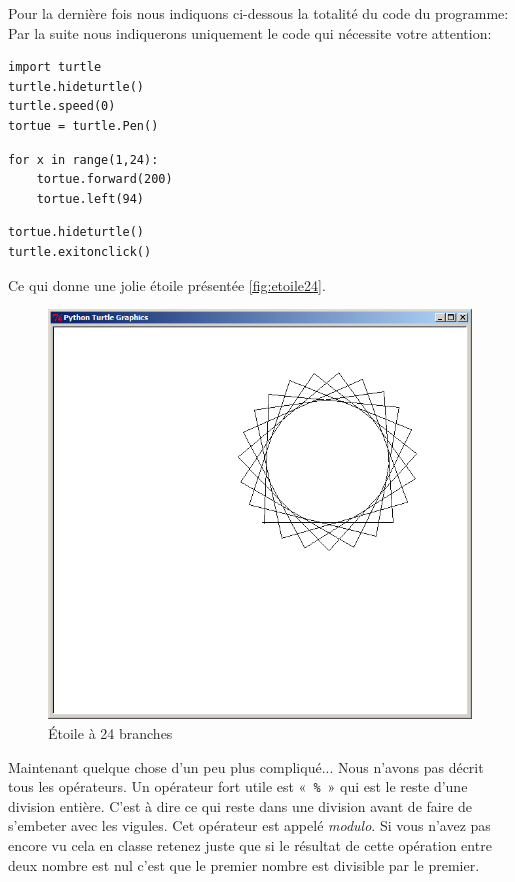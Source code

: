 Pour la dernière fois nous indiquons ci-dessous la totalité du code du programme: Par la suite nous indiquerons uniquement le code qui nécessite votre attention:
\begin{Verbatim}[frame=single,rulecolor=\color{mbleu}, label=ne sera plus rappelé]
import turtle
turtle.hideturtle()
turtle.speed(0)
tortue = turtle.Pen()
\end{Verbatim}
\begin{Verbatim}[frame=single,rulecolor=\color{mbleu}, label= à taper]
for x in range(1,24):
	tortue.forward(200)
	tortue.left(94)
\end{Verbatim}
\begin{Verbatim}[frame=single,rulecolor=\color{mbleu}, label=ne sera plus rappelé]
tortue.hideturtle()
turtle.exitonclick()
\end{Verbatim}
 
Ce qui donne une jolie étoile présentée \autoref{fig:etoile24}.
\begin{figure}[H]
\centering
\includegraphics[scale=0.4]{images/etoile24}
\caption{Étoile à 24 branches}\label{fig:etoile24}
\end{figure}

Maintenant quelque chose d'un peu plus compliqué... Nous n'avons pas décrit tous les opérateurs. Un opérateur fort utile est «~\texttt{\%}~» qui est le reste d'une division entière. C'est à dire ce qui reste dans une division avant de faire de s'embeter avec les vigules. Cet opérateur est appelé \emph{modulo}. Si vous n'avez pas encore vu cela en classe retenez juste que si le résultat de cette opération entre deux nombre est nul c'est que le premier nombre est divisible par le premier.

